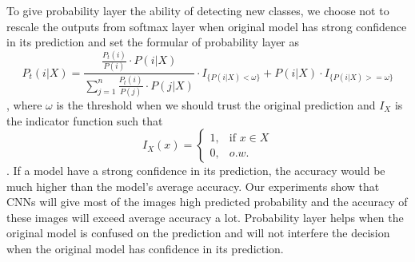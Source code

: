 \documentclass{article}
\begin{document}
To give probability layer the ability of detecting new classes, we choose not to rescale the outputs from softmax layer when original model has strong confidence in its prediction and set the formular of probability layer as
\begin{equation}
    P_t(i|X) = \frac{\frac{P_t(i)}{P(i)} \cdot P(i|X)}{\sum_{j=1}^n \frac{P_t(i)}{P(j)} \cdot P(j|X)} \cdot I_{\{P(i|X) < \omega\}} + P(i|X) \cdot I_{\{P(i|X) >= \omega\}}
\end{equation}
, where $\omega$ is the threshold when we should trust the original prediction and $I_X$ is the indicator function such that
\begin{equation}
I_X(x) = \begin{cases}
1, &\text{if $x \in X$}\\
0, &\text{$o.w.$}
\end{cases}
\end{equation}
. If a model have a strong confidence in its prediction, the accuracy would be much higher than the model's average accuracy. Our experiments show that CNNs will give most of the images high predicted probability and the accuracy of these images will exceed average accuracy a lot. Probability layer helps when the original model is confused on the prediction and will not interfere the decision when the original model has confidence in its prediction.
\end{document}

